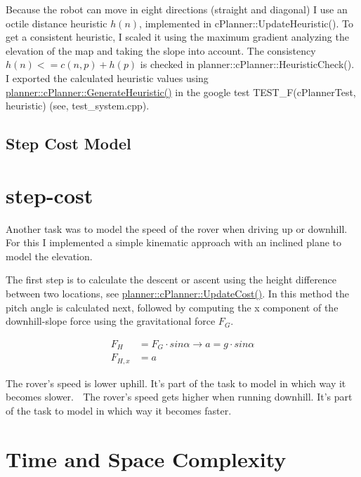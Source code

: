 Because the robot can move in eight directions (straight and diagonal) I use an octile distance heuristic $h(n)$, implemented in c\+Planner\+::\+Update\+Heuristic(). To get a consistent heuristic, I scaled it using the maximum gradient analyzing the elevation of the map and taking the slope into account. The consistency $ h(n) <= c(n,p) + h(p)$ is checked in planner\+::c\+Planner\+::\+Heuristic\+Check(). I exported the calculated heuristic values using \mbox{\hyperlink{classplanner_1_1c_planner_a1a4650050656545744796296a653d388}{planner\+::c\+Planner\+::\+Generate\+Heuristic()}} in the google test T\+E\+S\+T\+\_\+\+F(c\+Planner\+Test, heuristic) (see, test\+\_\+system.\+cpp).



\subsection*{Step Cost Model}\hypertarget{index_step-cost}{}\section{step-\/cost}\label{index_step-cost}
Another task was to model the speed of the rover when driving up or downhill. For this I implemented a simple kinematic approach with an inclined plane to model the elevation.





The first step is to calculate the descent or ascent using the height difference between two locations, see \mbox{\hyperlink{classplanner_1_1c_planner_a82e45fc2701e90d3fa9df72f475e455e}{planner\+::c\+Planner\+::\+Update\+Cost()}}. In this method the pitch angle is calculated next, followed by computing the x component of the downhill-\/slope force using the gravitational force $F_G$.

\begin{eqnarray*} F_H &= F_G \cdot sin\alpha \rightarrow a = g \cdot sin\alpha \\ F_{H,x} &= a \end{eqnarray*}

The rover’s speed is lower uphill. It’s part of the task to model in which way it becomes slower.  The rover’s speed gets higher when running downhill. It’s part of the task to model in which way it becomes faster.

\section*{Time and Space Complexity}

